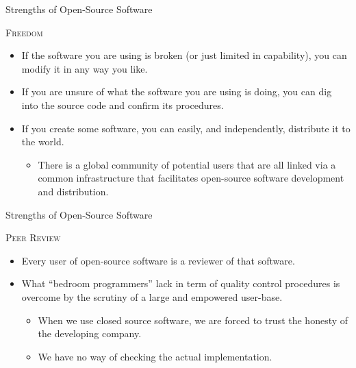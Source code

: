 \documentclass[10pt]{beamer}
\newcommand{\rmsc}[1]{\textrm{\textsc{#1}}}
\begin{document}

\begin{frame}{Strengths of Open-Source Software}

  \rmsc{Freedom}
  \vb
  \begin{itemize}
  \item If the software you are using is broken (or just limited in capability), 
    you can modify it in any way you like.
    \vb
  \item If you are unsure of what the software you are using is doing, you can 
    dig into the source code and confirm its procedures.
    \vb
  \item If you create some software, you can easily, and independently, 
    distribute it to the world.
    \vb
    \begin{itemize}
    \item There is a global community of potential users that are all linked via 
      a common infrastructure that facilitates open-source software development 
      and distribution.
    \end{itemize}
  \end{itemize}

\end{frame}


\begin{frame}{Strengths of Open-Source Software}

  \rmsc{Peer Review}
  \vb
  \begin{itemize}
  \item Every user of open-source software is a reviewer of that software.
    \vb
  \item What ``bedroom programmers'' lack in term of quality control procedures 
    is overcome by the scrutiny of a large and empowered user-base.
    \vc
    \begin{itemize}
    \item When we use closed source software, we are forced to trust the honesty 
      of the developing company.
      \vb
    \item We have no way of checking the actual implementation.
    \end{itemize}
  \end{itemize}

\end{frame}
\end{document}
